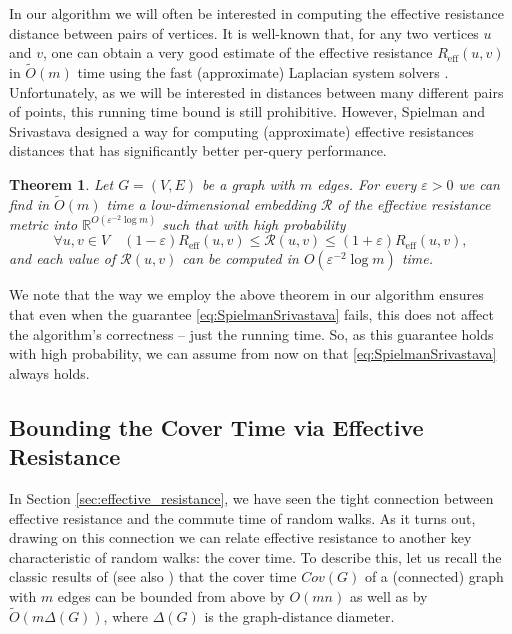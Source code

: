 \documentclass[11pt, letterpaper]{article}
\newtheorem{theorem}{Theorem}[section]
\newcommand{\tO}{\widetilde{O}}
\newcommand{\Reff}{R_{\mathrm{eff}}}
\newcommand{\diamdist}{\Delta}
\newcommand{\cR}{\mathcal{R}}
\begin{document}
In our algorithm we will often be interested in computing the effective resistance distance between pairs of vertices. It is well-known that, for any two vertices $u$ and $v$, one can obtain a very good estimate of the effective resistance $\Reff(u,v)$ in $\tO(m)$ time using the fast (approximate) Laplacian system solvers \cite{SpielmanT03,SpielmanT04,KoutisMP10,KoutisMP11,KelnerOSZ13}. Unfortunately, as we will be interested in distances between many different pairs of points, this running time bound is still prohibitive. However, Spielman and Srivastava \cite{SpielmanS08} designed a way for computing (approximate) effective resistances distances that has significantly better per-query performance. 
\begin{theorem}
\label{thm:SpielmanSrivastava}
Let $G=(V,E)$ be a graph with $m$ edges. For every $\varepsilon>0$ we can find in $\tO(m)$ time a low-dimensional embedding $\cR$ of the effective resistance metric into $\mathbb{R}^{O(\varepsilon^{-2}\log m)}$ such that with high probability
\begin{equation}
\label{eq:SpielmanSrivastava}
\forall u,v\in V \quad (1 - \varepsilon) \Reff(u,v) \le \cR(u,v) \le (1 + \varepsilon) \Reff(u,v),
\end{equation}
and each value of $\cR(u,v)$ can be computed in $O(\varepsilon^{-2}\log m)$ time.
\end{theorem} 
We note that the way we employ the above theorem in our algorithm ensures that even when the guarantee \eqref{eq:SpielmanSrivastava} fails, this does not affect the algorithm's correctness -- just the running time. So, as this guarantee holds with high probability, we can assume from now on that \eqref{eq:SpielmanSrivastava} always holds. 



\subsection{Bounding the Cover Time via Effective Resistance}
\label{sec:cover_time_and_effective_resistance}

In Section \ref{sec:effective_resistance}, we have seen the tight connection between effective resistance and the commute time of random walks. As it turns out, drawing on this connection we can relate effective resistance to another key characteristic of random walks: the cover time. To describe this, let us recall the classic results of \cite{AleliunasKLLR79} (see also \cite{Lovasz93}) that the cover time $Cov(G)$ of a (connected) graph with $m$ edges can be bounded from above by $O(mn)$ as well as by $\tO(m\diamdist(G))$, where $\diamdist(G)$ is the graph-distance diameter.
\end{document}
